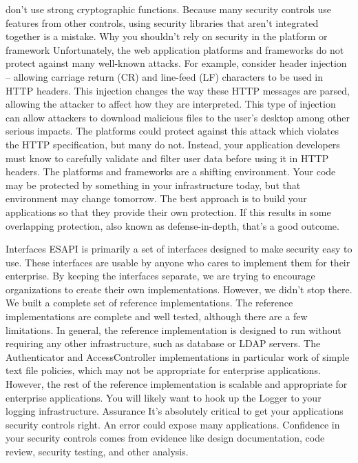 don’t use strong cryptographic functions. Because many security controls use features from other
controls, using security libraries that aren’t integrated together is a mistake.
Why you shouldn’t rely on security in the platform or framework
Unfortunately, the web application platforms and frameworks do not protect against many well-known
attacks. For example, consider header injection – allowing carriage return (CR) and line-feed (LF)
characters to be used in HTTP headers. This injection changes the way these HTTP messages are parsed,
allowing the attacker to affect how they are interpreted. This type of injection can allow attackers to
download malicious files to the user’s desktop among other serious impacts.
The platforms could protect against this attack which violates the HTTP specification, but many do not.
Instead, your application developers must know to carefully validate and filter user data before using it
in HTTP headers.
The platforms and frameworks are a shifting environment. Your code may be protected by something in
your infrastructure today, but that environment may change tomorrow. The best approach is to build
your applications so that they provide their own protection. If this results in some overlapping
protection, also known as defense-in-depth, that’s a good outcome. 

Interfaces
ESAPI is primarily a set of interfaces designed to make security easy to use. These interfaces are usable
by anyone who cares to implement them for their enterprise. By keeping the interfaces separate, we are
trying to encourage organizations to create their own implementations.
However, we didn’t stop there. We built a complete set of reference implementations. The reference
implementations are complete and well tested, although there are a few limitations. In general, the
reference implementation is designed to run without requiring any other infrastructure, such as
database or LDAP servers.
The Authenticator and AccessController implementations in particular work of simple text file policies,
which may not be appropriate for enterprise applications. However, the rest of the reference
implementation is scalable and appropriate for enterprise applications. You will likely want to hook up
the Logger to your logging infrastructure. 
Assurance
It’s absolutely critical to get your applications security controls right. An error could expose many
applications. Confidence in your security controls comes from evidence like design documentation, code
review, security testing, and other analysis. 

